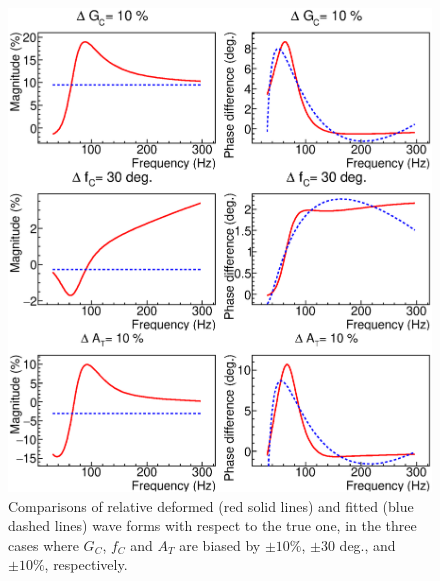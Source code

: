 \begin{figure}
\begin{center}
\includegraphics[width=\linewidth]{Figures/appa-cmp.eps}
\caption{Comparisons of relative deformed (red solid lines) and fitted 
(blue dashed lines) wave forms with respect to the true one, 
in the three cases where $G_C$, $f_C$ and $A_T$ are biased by 
$\pm 10\%$, $\pm 30$ deg., and $\pm 10\%$, respectively.}
\label{fig:appa-cmp} 
\end{center}
\end{figure}


